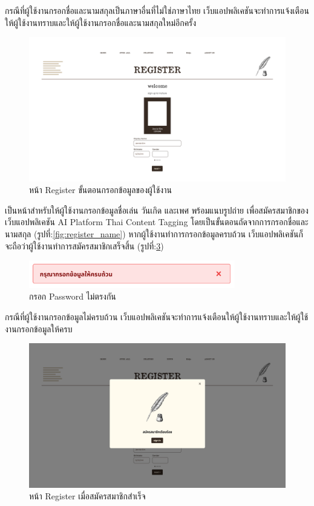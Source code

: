 \documentclass[12pt,oneside,openright,a4paper]{cpe-thai-project}
\begin{document}
\newline\hspace*{1cm}กรณีที่ผู้ใช้งานกรอกชื่อและนามสกุลเป็นภาษาอื่นที่ไม่ใช่ภาษาไทย เว็บแอปพลิเคชันจะทำการแจ้งเตือนให้ผู้ใช้งานทราบและให้ผู้ใช้งานกรอกชื่อและนามสกุลใหม่อีกครั้ง
\begin{figure}[!ht]\centering
  \includegraphics[width=16cm]{./img/project_ui/7.png} 
  \caption{หน้า Register ขั้นตอนกรอกข้อมูลของผู้ใช้งาน}\label{fig:register_info} 
\end{figure}
\newline\hspace*{1cm}เป็นหน้าสำหรับให้ผู้ใช้งานกรอกข้อมูลชื่อเล่น วันเกิด และเพศ พร้อมแนบรูปถ่าย เพื่อสมัครสมาชิกของเว็บแอปพลิเคชัน AI Platform Thai Content Tagging 
โดยเป็นขั้นตอนถัดจากการกรอกชื่อและนามสกุล (รูปที่:\ref{fig:register_name}) หากผู้ใช้งานทำการกรอกข้อมูลครบถ้วน เว็บแอปพลิเคชันก็จะถือว่าผู้ใช้งานทำการสมัครสมาชิกเสร็จสิ้น (รูปที่:\ref{fig:register_already})
\begin{figure}[!ht]\centering
  \includegraphics[width=9cm]{./img/project_ui/all_inform.png} 
  \caption{กรอก Password ไม่ตรงกัน}\label{fig:all_inform} 
\end{figure}
\newline\hspace*{1cm}กรณีที่ผู้ใช้งานกรอกข้อมูลไม่ครบถ้วน เว็บแอปพลิเคชันจะทำการแจ้งเตือนให้ผู้ใช้งานทราบและให้ผู้ใช้งานกรอกข้อมูลให้ครบ \newpage
\begin{figure}[!ht]\centering
  \includegraphics[width=15cm]{./img/project_ui/regis_ready.png} 
  \caption{หน้า Register เมื่อสมัครสมาชิกสำเร็จ}\label{fig:register_already} 
\end{figure}
\end{document}
